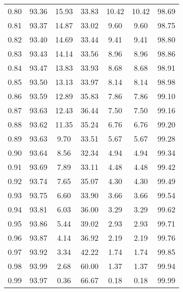 \begin{tabular}{|c|c|c|c|c|c|c|}
      0.80 &     93.36 &     15.93 &      33.83 &   10.42 &      10.42 &         98.69 \\
      0.81 &     93.37 &     14.87 &      33.02 &    9.60 &       9.60 &         98.75 \\
      0.82 &     93.40 &     14.69 &      33.44 &    9.41 &       9.41 &         98.80 \\
      0.83 &     93.43 &     14.14 &      33.56 &    8.96 &       8.96 &         98.86 \\
      0.84 &     93.47 &     13.83 &      33.93 &    8.68 &       8.68 &         98.91 \\
      0.85 &     93.50 &     13.13 &      33.97 &    8.14 &       8.14 &         98.98 \\
      0.86 &     93.59 &     12.89 &      35.83 &    7.86 &       7.86 &         99.10 \\
      0.87 &     93.63 &     12.43 &      36.44 &    7.50 &       7.50 &         99.16 \\
      0.88 &     93.62 &     11.35 &      35.24 &    6.76 &       6.76 &         99.20 \\
      0.89 &     93.63 &      9.70 &      33.51 &    5.67 &       5.67 &         99.28 \\
      0.90 &     93.64 &      8.56 &      32.34 &    4.94 &       4.94 &         99.34 \\
      0.91 &     93.69 &      7.89 &      33.11 &    4.48 &       4.48 &         99.42 \\
      0.92 &     93.74 &      7.65 &      35.07 &    4.30 &       4.30 &         99.49 \\
      0.93 &     93.75 &      6.60 &      33.90 &    3.66 &       3.66 &         99.54 \\
      0.94 &     93.81 &      6.03 &      36.00 &    3.29 &       3.29 &         99.62 \\
      0.95 &     93.86 &      5.44 &      39.02 &    2.93 &       2.93 &         99.71 \\
      0.96 &     93.87 &      4.14 &      36.92 &    2.19 &       2.19 &         99.76 \\
      0.97 &     93.92 &      3.34 &      42.22 &    1.74 &       1.74 &         99.85 \\
      0.98 &     93.99 &      2.68 &      60.00 &    1.37 &       1.37 &         99.94 \\
      0.99 &     93.97 &      0.36 &      66.67 &    0.18 &       0.18 &         99.99 \\
\bottomrule
\end{tabular}
